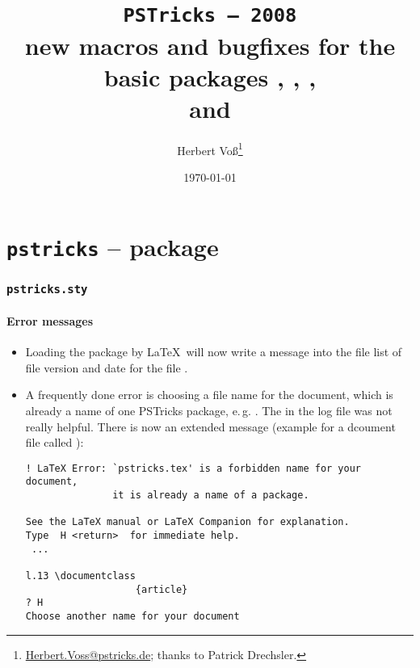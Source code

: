 \documentclass[11pt]{article}
\begin{document}
\title{\texttt{PSTricks -- 2008}\\ new macros and bugfixes for the
basic packages , , ,\\ and }
\author{Herbert Voß\thanks{%
\url{Herbert.Voss@pstricks.de}; \newline thanks to Patrick Drechsler.}}
\date{\today}

\maketitle

\clearpage
\tableofcontents

\clearpage
\part{\texttt{pstricks} -- package}

\section{\texttt{pstricks.sty}}

\subsection{Error messages}
\begin{itemize}
\item Loading the package  by \LaTeX\ will now write a message
into the file list of file version and date for the file .
\item A frequently done error is choosing a file name for the document, which is
already a name of one PSTricks package, e.\,g. . The  
in the log file was not really helpful. There is now an extended message
(example for a dcoument file called ):
{\small\begin{verbatim}
! LaTeX Error: `pstricks.tex' is a forbidden name for your document,
               it is already a name of a package.

See the LaTeX manual or LaTeX Companion for explanation.
Type  H <return>  for immediate help.
 ...                                              
                                                  
l.13 \documentclass
                   {article}
? H
Choose another name for your document
\end{verbatim}
}
\end{itemize}
\end{document}
